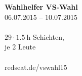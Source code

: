 \documentclass[a8paper, landscape]{scrartcl}
\begin{document}
\clearpage
\vspace*{\fill}
\begin{minipage}{.9\textwidth}
    \textbf{Wahlhelfer VS-Wahl}\\06.07.2015 -- 10.07.2015\\\\
    $29 \cdot \SI{1.5}{\hour}$ Schichten,\\
    je 2 Leute\\\\
    redseat.de/vswahl15
\end{minipage}
\vfill %
\end{document}
